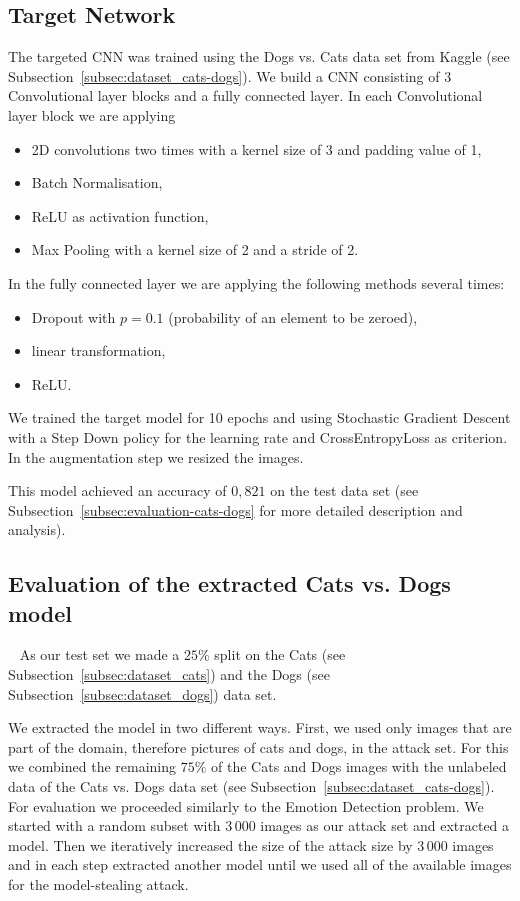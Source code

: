 \documentclass[a4paper,11pt]{article}
\begin{document}
    \subsection{Target Network}
        The targeted CNN was trained using the Dogs vs. Cats data set from Kaggle (see Subsection~\ref{subsec:dataset_cats-dogs}). We build a CNN consisting of 3 Convolutional layer blocks and a fully connected layer. In each Convolutional layer block we are applying
        \begin{itemize}
            \item 2D convolutions two times with a kernel size of 3 and padding value of 1,
            \item Batch Normalisation,
            \item ReLU as activation function,
            \item Max Pooling with a kernel size of 2 and a stride of 2. 
        \end{itemize}
        In the fully connected layer we are applying the following methods several times:
        \begin{itemize}
            \item Dropout with $p=0.1$ (probability of an element to be zeroed),
            \item linear transformation,
            \item ReLU.
        \end{itemize}
       
       We trained the target model for 10 epochs and using Stochastic Gradient Descent with a Step Down policy for the learning rate and CrossEntropyLoss as criterion. In the augmentation step we resized the images. 
       
       This model achieved an accuracy of $0,821$ on the test data set (see Subsection~\ref{subsec:evaluation-cats-dogs} for more detailed description and analysis). 
       
    \subsection{Evaluation of the extracted Cats vs. Dogs model}~\label{subsec:evaluation-cats-dogs}
        As our test set we made a $25\%$ split on the Cats (see Subsection~\ref{subsec:dataset_cats}) and the Dogs (see Subsection~\ref{subsec:dataset_dogs}) data set. 
        
        We extracted the model in two different ways. First, we used only images that are part of the domain, therefore pictures of cats and dogs, in the attack set. For this we combined the remaining $75\%$ of the Cats and Dogs images with the unlabeled data of the Cats vs. Dogs data set (see Subsection~\ref{subsec:dataset_cats-dogs}). 
        For evaluation we proceeded similarly to the Emotion Detection problem. We started with a random subset with $3\,000$ images as our attack set and extracted a model. Then we iteratively increased the size of the attack size by $3\,000$ images and in each step extracted another model until we used all of the available images for the model-stealing attack.
        
\end{document}
